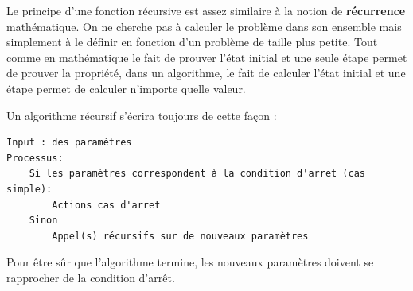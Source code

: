 \documentclass{../cours}
\begin{document}
Le principe d'une fonction récursive est assez similaire à la notion de \textbf{récurrence} mathématique. On ne cherche pas à calculer le problème dans son ensemble mais simplement à le définir en fonction d'un problème de taille plus petite. Tout comme en mathématique le fait de prouver l'état initial et une seule étape permet de prouver la propriété, dans un algorithme, le fait de calculer l'état initial et une étape permet de calculer n'importe quelle valeur. 

Un algorithme récursif s'écrira toujours de cette façon :

\begin{lstlisting}
Input : des paramètres
Processus:
    Si les paramètres correspondent à la condition d'arret (cas simple):
        Actions cas d'arret
    Sinon
        Appel(s) récursifs sur de nouveaux paramètres
\end{lstlisting}

Pour être sûr que l'algorithme termine, les nouveaux paramètres doivent se rapprocher de la condition d'arrêt.
\end{document}
